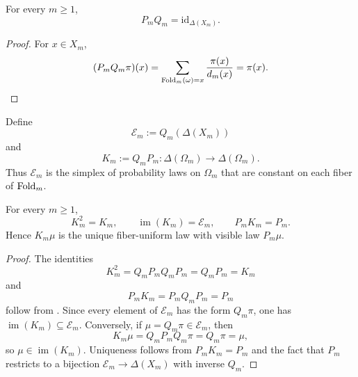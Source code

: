 \begin{proposition}
\label{prop:split-epi}
For every \(m\ge 1\),
\[
  P_mQ_m=\mathrm{id}_{\Delta(X_m)}.
\]
\end{proposition}

\begin{proof}
For \(x\in X_m\),
\[
  (P_mQ_m\pi)(x)
  =
  \sum_{\mathrm{Fold}_m(\omega)=x}\frac{\pi(x)}{d_m(x)}
  =
  \pi(x).
\]
\end{proof}

\begin{definition}
\label{def:reflector}
Define
\[
  \mathcal E_m:=Q_m(\Delta(X_m))
\]
and
\[
  K_m:=Q_mP_m\colon \Delta(\Omega_m)\to\Delta(\Omega_m).
\]
Thus \(\mathcal E_m\) is the simplex of probability laws on \(\Omega_m\) that
are constant on each fiber of \(\mathrm{Fold}_m\).
\end{definition}

\begin{proposition}
\label{prop:reflector}
For every \(m\ge 1\),
\[
  K_m^2=K_m,
  \qquad
  \operatorname{im}(K_m)=\mathcal E_m,
  \qquad
  P_mK_m=P_m.
\]
Hence \(K_m\mu\) is the unique fiber-uniform law with visible law \(P_m\mu\).
\end{proposition}

\begin{proof}
The identities
\[
  K_m^2
  =
  Q_mP_mQ_mP_m
  =
  Q_mP_m
  =
  K_m
\]
and
\[
  P_mK_m
  =
  P_mQ_mP_m
  =
  P_m
\]
follow from .  Since every element of \(\mathcal E_m\) has
the form \(Q_m\pi\), one has \(\operatorname{im}(K_m)\subseteq \mathcal E_m\).
Conversely, if \(\mu=Q_m\pi\in\mathcal E_m\), then
\[
  K_m\mu
  =
  Q_mP_mQ_m\pi
  =
  Q_m\pi
  =
  \mu,
\]
so \(\mu\in\operatorname{im}(K_m)\).  Uniqueness follows from \(P_mK_m=P_m\)
and the fact that \(P_m\) restricts to a bijection \(\mathcal E_m\to\Delta(X_m)\)
with inverse \(Q_m\).
\end{proof}
